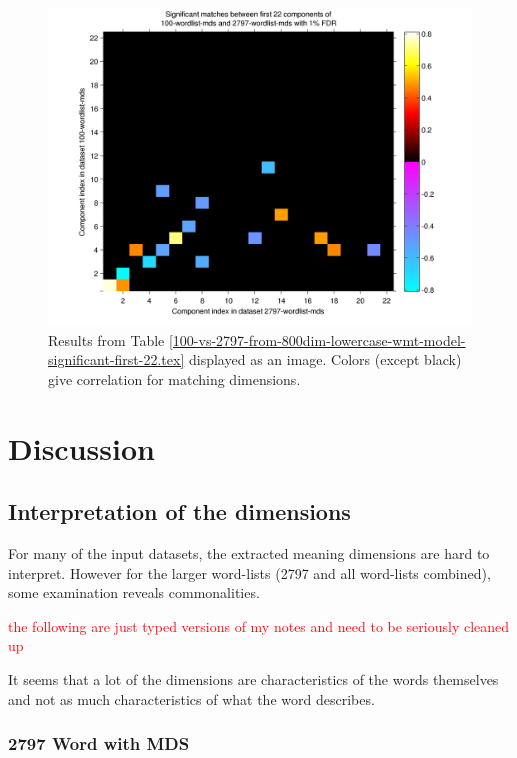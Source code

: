 \documentclass[10pt,letterpaper]{book}
\newcommand{\todo}[1]{\textcolor{red}{#1}}
\begin{document}
\begin{figure}[!tbp]
    \includegraphics[width=0.9\linewidth]{100-vs-2797-from-800dim-lowercase-wmt-model-significant-first-22}
    \caption{Results from Table 
    \ref{100-vs-2797-from-800dim-lowercase-wmt-model-significant-first-22.tex} 
    displayed as an image. Colors (except black) give correlation for matching 
    dimensions.}
    \label{fig:100vs2797First22}
\end{figure}


\chapter{Discussion}

\section{Interpretation of the dimensions}

For many of the input datasets, the extracted meaning dimensions are hard to 
interpret. However for the larger word-lists (2797 and all word-lists 
combined), some examination reveals commonalities. 

\todo{the following are just typed versions of my notes and need to be 
seriously cleaned up}

It seems that a lot of the dimensions are characteristics of the words 
themselves and not as much characteristics of what the word describes.

\subsection{2797 Word with MDS}
\end{document}
